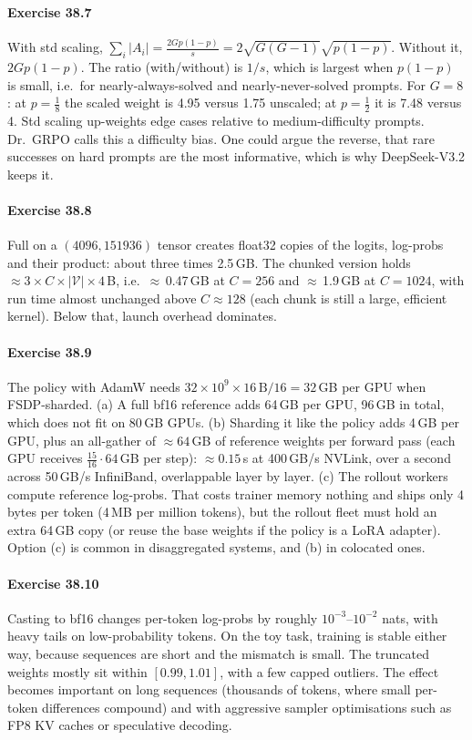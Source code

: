 \paragraph{Exercise 38.7} With std scaling, $\sum_i|A_i|=\frac{2Gp(1-p)}{s}
=2\sqrt{G(G-1)}\sqrt{p(1-p)}$. Without it, $2Gp(1-p)$. The ratio (with/without) is $1/s$,
which is largest when $p(1-p)$ is small, i.e.\ for nearly-always-solved and nearly-never-solved
prompts. For $G=8$: at $p=\frac18$ the scaled weight is 4.95 versus 1.75 unscaled; at
$p=\frac12$ it is 7.48 versus 4. Std scaling up-weights edge cases relative to medium-difficulty
prompts. Dr.~GRPO calls this a difficulty bias. One could argue the reverse, that rare
successes on hard prompts are the most informative, which is why DeepSeek-V3.2 keeps it.

\paragraph{Exercise 38.8} Full  on a $(4096,\num{151936})$ tensor creates
float32 copies of the logits, log-probs and their product: about three times 2.5\,GB. The chunked
version holds $\approx3\times C\times|\mathcal V|\times4$\,B, i.e.\ $\approx$\,0.47\,GB at
$C=256$ and $\approx$\,1.9\,GB at $C=1024$, with run time almost unchanged above
$C\approx128$ (each chunk is still a large, efficient kernel). Below that, launch overhead dominates.

\paragraph{Exercise 38.9} The policy with AdamW needs $32\times10^9\times16\,\text{B}/16=32$\,GB
per GPU when FSDP-sharded. (a) A full bf16 reference adds 64\,GB per GPU, 96\,GB in total,
which does not fit on 80\,GB GPUs. (b) Sharding it like the policy adds 4\,GB per GPU, plus an
all-gather of $\approx64$\,GB of reference weights per forward pass (each GPU receives
$\frac{15}{16}\cdot64$\,GB per step): $\approx0.15$\,s at 400\,GB/s NVLink, over a second across
50\,GB/s InfiniBand, overlappable layer by layer. (c) The rollout workers compute reference
log-probs. That costs trainer memory nothing and ships only 4 bytes per token (4\,MB per million
tokens), but the rollout fleet must hold an extra 64\,GB copy (or reuse the base weights if the
policy is a LoRA adapter). Option (c) is common in disaggregated systems, and (b) in colocated ones.

\paragraph{Exercise 38.10} Casting to bf16 changes per-token log-probs by roughly
$10^{-3}$--$10^{-2}$ nats, with heavy tails on low-probability tokens. On the toy task,
training is stable either way, because sequences are short and the mismatch is small. The
truncated weights mostly sit within $[0.99,1.01]$, with a few capped outliers. The effect
becomes important on long sequences (thousands of tokens, where small per-token differences
compound) and with aggressive sampler optimisations such as FP8 KV caches or speculative decoding.
